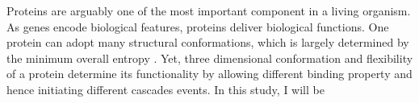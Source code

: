 Proteins are arguably one of the most important component in a living organism. As genes encode biological features, proteins deliver biological functions. One protein can adopt many structural conformations, which is largely determined by the minimum overall entropy . Yet, three dimensional conformation and flexibility of a protein determine its functionality by allowing different binding property and hence initiating different cascades events. In this study, I will be 